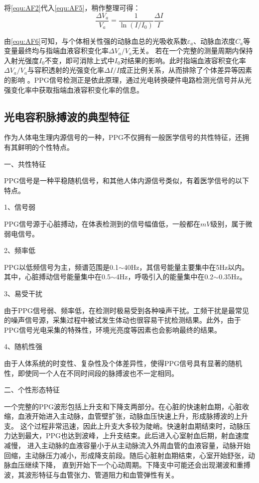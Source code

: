 将\autoref{equ:AF2}代入\autoref{equ:AF5}，稍作整理可得：
\begin{equation}
    \label{equ:AF6}
    \frac{\Delta V_{a}}{V_{a}}=\frac{1}{\ln(I/I_{0})}\frac{\Delta I}{I}
\end{equation}

由\autoref{equ:AF6}可知，与个体相关性强的动脉血总的光吸收系数$\varepsilon _{a}$、动脉血浓度$C_{a}$等变量最终均与指端血液容积变化率$\Delta V_{a}/{V_{a}}$无关。
若在一个完整的测量周期内保持入射光强度$I_{0}$不变，即可消除上式中$I_{0}$对结果的影响。此时指端血液容积变化率$\Delta V_{a}/{V_{a}}$与容积透射的光强变化率$\Delta I/I$成正比例关系，从而排除了个体差异等因素的影响
\cite{1980Spectrophotometric,4122392,PPGYY}。PPG信号检测正是依此原理，通过光电转换硬件电路检测光信号并从光强变化率中获取指端血液容积变化率的信息。

\subsection{光电容积脉搏波的典型特征}
作为人体电生理内源信号的一种，PPG不仅拥有一般医学信号的共性特征，还拥有其鲜明的个性特点。

一、共性特征

PPG信号是一种平稳随机信号，和其他人体内源信号类似，有着医学信号的以下特点\cite{Qiu2012,Naraharisetti2011,Miao2020,LMX2017}。

1、信号弱

PPG信号源于心脏搏动，在体表检测到的信号幅值低，一般都在$mV$级别，属于微弱电信号。

2、频率低

PPG以低频信号为主，频谱范围是0.1$\sim$40Hz，其信号能量主要集中在5Hz以内。其中，心脏搏动信号能量集中在0.5$\sim$4Hz，呼吸引入的能量集中在0.2$\sim$0.35Hz。

3、易受干扰

由于PPG信号弱、频率低，在检测时极易受到各种噪声干扰。工频干扰是最常见的噪声信号源，采集过程中被试发生体动也很容易干扰检测结果。此外，由于PPG信号光电采集的特殊性，环境光亮度等因素也会影响最终的结果。

4、随机性强

由于人体系统的时变性、复杂性及个体差异性，使得PPG信号具有显著的随机性，即使同一个人在不同时间段的脉搏波也不一定相同。

二、个性形态特征

一个完整的PPG波形包括上升支和下降支两部分。在心脏的快速射血期，心脏收缩，血液开始进入主动脉，血管壁扩张，动脉血压快速上升，形成脉搏波的上升支。
这个过程非常迅速，因此上升支大多较为陡峭。快速射血期结束时，动脉压力达到最大，PPG也达到波峰，上升支结束。此后进入心室射血后期，射血速度减慢，
进入主动脉的血液容量小于从主动脉流入外周血管的血液容量，动脉开始回缩，主动脉压力减小，形成降支前段。随后心脏射血期结束，心室开始舒张，动脉血压继续下降，
直到开始下一个心动周期。下降支中可能还会出现潮波和重搏波，其波形特征与血管张力、管道阻力和血管弹性有关\cite{PPGYY}。

